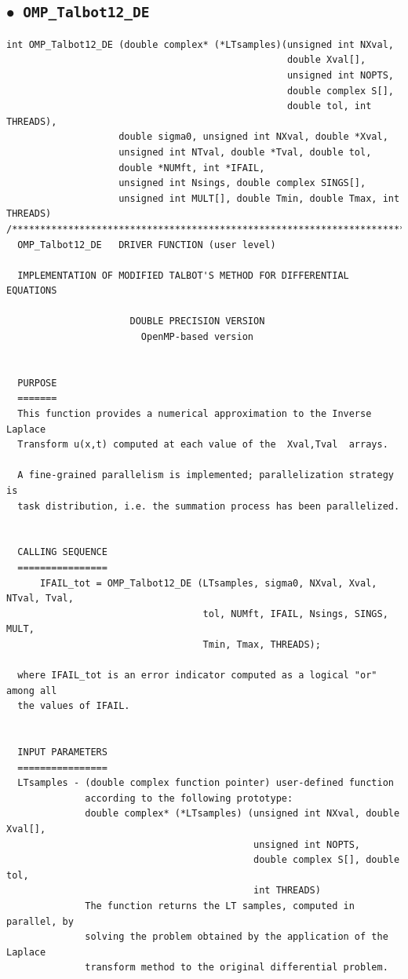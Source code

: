 \documentclass[a4paper,10pt]{report}%
\begin{document}
\subsection{\texorpdfstring{$\boldsymbol{\bullet}$}{ - }{\tt\ OMP\_Talbot12\_DE}}
\begin{lstlisting}
int OMP_Talbot12_DE (double complex* (*LTsamples)(unsigned int NXval,
                                                  double Xval[],
                                                  unsigned int NOPTS,
                                                  double complex S[],
                                                  double tol, int THREADS),
                    double sigma0, unsigned int NXval, double *Xval,
                    unsigned int NTval, double *Tval, double tol,
                    double *NUMft, int *IFAIL,
                    unsigned int Nsings, double complex SINGS[],
                    unsigned int MULT[], double Tmin, double Tmax, int THREADS)
/*****************************************************************************
  OMP_Talbot12_DE   DRIVER FUNCTION (user level)

  IMPLEMENTATION OF MODIFIED TALBOT'S METHOD FOR DIFFERENTIAL EQUATIONS

                      DOUBLE PRECISION VERSION
                        OpenMP-based version


  PURPOSE
  =======
  This function provides a numerical approximation to the Inverse Laplace
  Transform u(x,t) computed at each value of the  Xval,Tval  arrays.

  A fine-grained parallelism is implemented; parallelization strategy is
  task distribution, i.e. the summation process has been parallelized.


  CALLING SEQUENCE
  ================
      IFAIL_tot = OMP_Talbot12_DE (LTsamples, sigma0, NXval, Xval, NTval, Tval,
                                   tol, NUMft, IFAIL, Nsings, SINGS, MULT,
                                   Tmin, Tmax, THREADS);

  where IFAIL_tot is an error indicator computed as a logical "or" among all
  the values of IFAIL.


  INPUT PARAMETERS
  ================
  LTsamples - (double complex function pointer) user-defined function
              according to the following prototype:
              double complex* (*LTsamples) (unsigned int NXval, double Xval[],
                                            unsigned int NOPTS,
                                            double complex S[], double tol,
                                            int THREADS)
              The function returns the LT samples, computed in parallel, by
              solving the problem obtained by the application of the Laplace
              transform method to the original differential problem.


\end{lstlisting}
\end{document}
